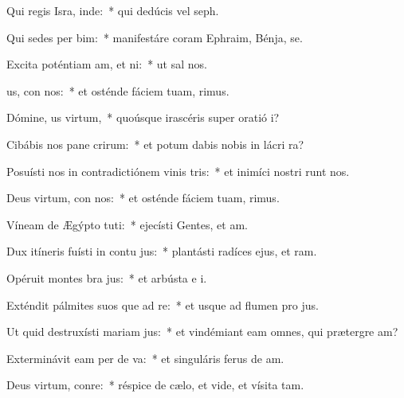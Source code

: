 \item Qui regis Isra, inde:~* qui dedúcis vel  seph.
\item Qui sedes per bim:~* manifestáre coram Ephraim, Bénja,  se.
\item Excita poténtiam am, et ni:~* ut sal  nos.
\item {}us, con nos:~* et osténde fáciem tuam,   rimus.
\item Dómine, us virtum,~* quoúsque irascéris super oratió  i?
\item Cibábis nos pane crirum:~* et potum dabis nobis in lácri  ra?
\item Posuísti nos in contradictiónem vinis tris:~* et inimíci nostri runt nos.
\item Deus virtum, con nos:~* et osténde fáciem tuam,   rimus.
\item Víneam de Ægýpto tuti:~* ejecísti Gentes, et  am.
\item Dux itíneris fuísti in contu jus:~* plantásti radíces ejus, et  ram.
\item Opéruit montes bra jus:~* et arbústa e  i.
\item Exténdit pálmites suos que ad re:~* et usque ad flumen pro jus.
\item Ut quid destruxísti mariam jus:~* et vindémiant eam omnes, qui prætergre am?
\item Exterminávit eam per de va:~* et singuláris ferus de  am.
\item Deus virtum, conre:~* réspice de cælo, et vide, et vísita  tam.
